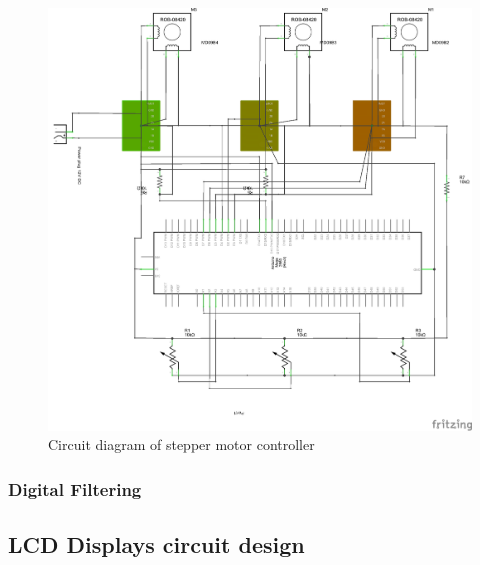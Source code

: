 \begin{figure}[H]
	\centering
	\includegraphics[width=\maxwidth{15cm}, keepaspectratio]{Chapters/Fig/stepper_coltroler_circuit_schem.png}
	\caption{Circuit diagram of stepper motor controller}
	\label{fig:stepper_coltroler_circuit_schem}
\end{figure}

\subsubsection{Digital Filtering}


\subsection{LCD Displays circuit design}

